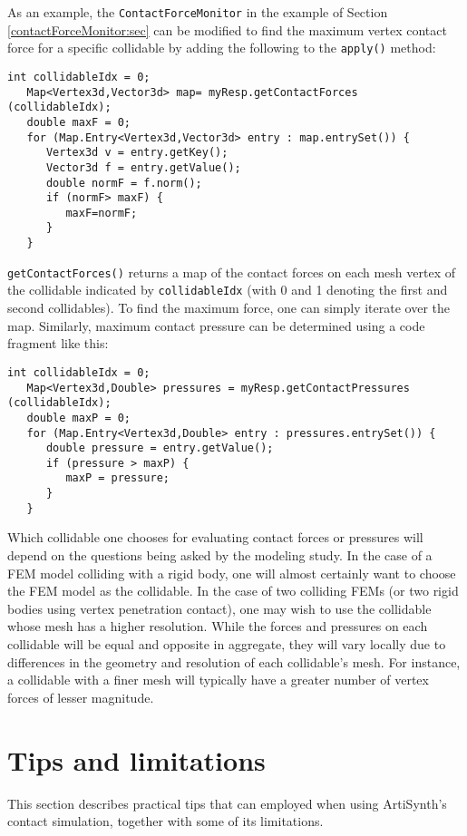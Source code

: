As an example, the {\tt ContactForceMonitor} in the example of
Section \ref{contactForceMonitor:sec} can be modified to find the maximum
vertex contact force for a specific collidable by adding the following to the
{\tt apply()} method:
%
\begin{lstlisting}[]
   int collidableIdx = 0;
   Map<Vertex3d,Vector3d> map= myResp.getContactForces (collidableIdx);
   double maxF = 0;
   for (Map.Entry<Vertex3d,Vector3d> entry : map.entrySet()) {
      Vertex3d v = entry.getKey();
      Vector3d f = entry.getValue();
      double normF = f.norm();
      if (normF> maxF) {
         maxF=normF;
      }
   }
\end{lstlisting}
{\tt getContactForces()} returns a map of the contact forces on each mesh
vertex of the collidable indicated by {\tt collidableIdx} (with 0 and 1
denoting the first and second collidables). To find the maximum force, one can
simply iterate over the map.  Similarly, maximum contact pressure can be
determined using a code fragment like this:
\begin{lstlisting}[]
   int collidableIdx = 0;
   Map<Vertex3d,Double> pressures = myResp.getContactPressures (collidableIdx);
   double maxP = 0;
   for (Map.Entry<Vertex3d,Double> entry : pressures.entrySet()) {
      double pressure = entry.getValue();
      if (pressure > maxP) {
         maxP = pressure;
      }
   }
\end{lstlisting}

Which collidable one chooses for evaluating contact forces or pressures will
depend on the questions being asked by the modeling study. In the case of a FEM
model colliding with a rigid body, one will almost certainly want to choose the
FEM model as the collidable. In the case of two colliding FEMs (or two rigid
bodies using vertex penetration contact), one may wish to use the collidable
whose mesh has a higher resolution.  While the forces and pressures on each
collidable will be equal and opposite in aggregate, they will vary locally due
to differences in the geometry and resolution of each collidable's mesh. For
instance, a collidable with a finer mesh will typically have a greater number
of vertex forces of lesser magnitude.
         
\section{Tips and limitations}
\label{ContactLimitations:sec}

This section describes practical tips that can employed when using
ArtiSynth's contact simulation, together with some of its limitations.

